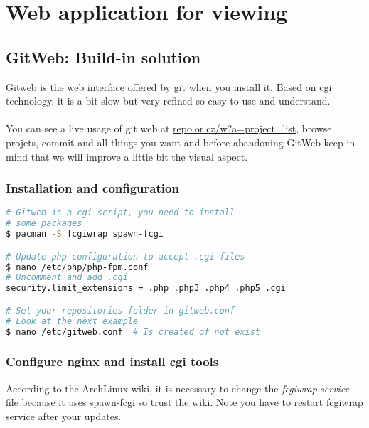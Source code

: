 \begin{comment}
	\begin{lstlisting}[language=bash,caption=Host repository from local copy]
# Extract project informations
$ mv /srv/git/project/.git /srv/git/project.git
$ rm -r /srv/git/project

# Declare repository as bare
$ cd /sr	v/git/project.git
$ git config --bool core.bare true
	\end{lstlisting}
\end{comment}
\section{Web application for viewing}
\subsection{GitWeb: Build-in solution}
Gitweb is the web interface offered by git when you install it. Based on cgi 
technology, it is a bit slow but very refined so easy to use and understand.
\\\\
You can see a live usage of git web at \href{http://repo.or.cz/w?a=project\_list}
{repo.or.cz/w?a=project\_list}, browse projets, commit and all things you want and 
before abandoning GitWeb keep in mind that we will improve a little bit the visual 
aspect.

\subsubsection{Installation and configuration}
\begin{lstlisting}[language=bash,caption=Gitweb setup]
# Gitweb is a cgi script, you need to install 
# some packages
$ pacman -S fcgiwrap spawn-fcgi

# Update php configuration to accept .cgi files
$ nano /etc/php/php-fpm.conf
# Uncomment and add .cgi
security.limit_extensions = .php .php3 .php4 .php5 .cgi

# Set your repositories folder in gitweb.conf
# Look at the next example
$ nano /etc/gitweb.conf  # Is created of not exist
\end{lstlisting}

\lstset{language=bash,caption=gitweb.conf file}


\subsubsection{Configure nginx and install cgi tools}
According to the ArchLinux wiki, it is necessary to change the \emph{fcgiwrap.service} 
file because it uses spawn-fcgi so trust the wiki. Note you have to restart 
fcgiwrap service after your updates.

